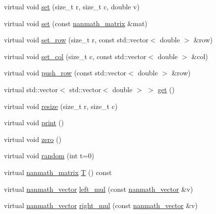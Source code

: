 \begin{DoxyCompactItemize}
\item 
virtual void \hyperlink{classnanmath_1_1nanmath__matrix_a96c4e5fed99527adee5ff5b756589d0d}{set} (size\+\_\+t r, size\+\_\+t c, double v)
\item 
virtual void \hyperlink{classnanmath_1_1nanmath__matrix_a0074200e9eaa3ffb2b9ce6602e1bfd5d}{set} (const \hyperlink{classnanmath_1_1nanmath__matrix}{nanmath\+\_\+matrix} \&mat)
\item 
virtual void \hyperlink{classnanmath_1_1nanmath__matrix_afd46732914cf6da29d584cbbb4a47499}{set\+\_\+row} (size\+\_\+t r, const std\+::vector$<$ double $>$ \&row)
\item 
virtual void \hyperlink{classnanmath_1_1nanmath__matrix_af5eea2f6b98686e9b243c02513908d16}{set\+\_\+col} (size\+\_\+t c, const std\+::vector$<$ double $>$ \&col)
\item 
virtual void \hyperlink{classnanmath_1_1nanmath__matrix_a2611cc9aef30706e7f11e15cd2405699}{push\+\_\+row} (const std\+::vector$<$ double $>$ \&row)
\item 
virtual std\+::vector$<$ std\+::vector$<$ double $>$ $>$ \hyperlink{classnanmath_1_1nanmath__matrix_aac2fd129eff7ea0248ccc49e24414454}{get} ()
\item 
virtual void \hyperlink{classnanmath_1_1nanmath__matrix_ac27e457cd31058c95b9b5ccf7b4809c0}{resize} (size\+\_\+t r, size\+\_\+t c)
\item 
virtual void \hyperlink{classnanmath_1_1nanmath__matrix_a114b8a9aa414e94b06c0ddd9496a34d8}{print} ()
\item 
virtual void \hyperlink{classnanmath_1_1nanmath__matrix_aa4dadc0c46659f398ad576eac8c3b064}{zero} ()
\item 
virtual void \hyperlink{classnanmath_1_1nanmath__matrix_a625284547b9fbbef11b331cf312cd74e}{random} (int t=0)
\item 
virtual \hyperlink{classnanmath_1_1nanmath__matrix}{nanmath\+\_\+matrix} \hyperlink{classnanmath_1_1nanmath__matrix_a1e04289b0bfb7556f2d4c25d49a8198d}{T} () const 
\item 
virtual \hyperlink{classnanmath_1_1nanmath__vector}{nanmath\+\_\+vector} \hyperlink{classnanmath_1_1nanmath__matrix_aaebae090e22fdb90b531ea376a958959}{left\+\_\+mul} (const \hyperlink{classnanmath_1_1nanmath__vector}{nanmath\+\_\+vector} \&v)
\item 
virtual \hyperlink{classnanmath_1_1nanmath__vector}{nanmath\+\_\+vector} \hyperlink{classnanmath_1_1nanmath__matrix_a785f78f5f75769e2e4d1dbe23c37ea2a}{right\+\_\+mul} (const \hyperlink{classnanmath_1_1nanmath__vector}{nanmath\+\_\+vector} \&v)

\end{DoxyCompactItemize}
